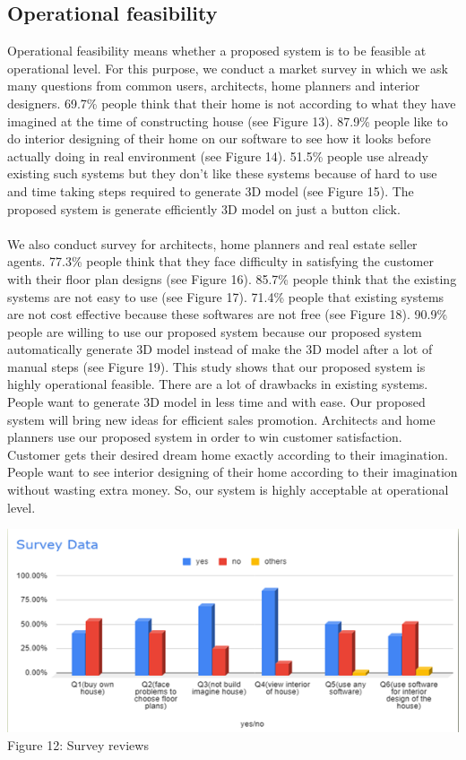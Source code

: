 \documentclass{article}
\begin{document}
\subsection{Operational feasibility}
Operational feasibility means whether a proposed system is to be feasible at operational level. For this purpose, we conduct a market survey in which we ask many questions from common users, architects, home planners and interior designers. 69.7\% people think that their home is not according to what they have imagined at the time of constructing house (see Figure 13). 87.9\% people like to do interior designing of their home on our software to see how it looks before actually doing in real environment (see Figure 14). 51.5\% people use already existing such systems but they don’t like these systems because of hard to use and time taking steps required to generate 3D model (see Figure 15). The proposed system is generate efficiently 3D model on just a button click.
\\
\\
We also conduct survey for architects, home planners and real estate seller agents. 77.3\% people think that they face difficulty in satisfying the customer with their floor plan designs (see Figure 16). 85.7\% people think that the existing systems are not easy to use (see Figure 17). 71.4\% people that existing systems are not cost effective because these softwares are not free (see Figure 18). 90.9\% people are willing to use our proposed system because our proposed system automatically generate 3D model instead of make the 3D model after a lot of manual steps (see Figure 19). 
This study shows that our proposed system is highly operational feasible. There are a lot of drawbacks in existing systems. People want to generate 3D model in less time and with ease. Our proposed system will bring new ideas for efficient sales promotion. Architects and home planners use our proposed system in order to win customer satisfaction. Customer gets their desired dream home exactly according to their imagination. People want to see interior designing of their home according to their imagination without wasting extra money. So, our system is highly acceptable at operational level.
\begin{center}
\includegraphics[scale=0.9]{surveydata}
\\Figure 12: Survey reviews
\end{center}
\end{document}
